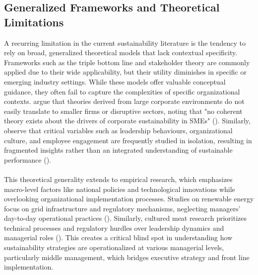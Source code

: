 	\subsection{Generalized Frameworks and Theoretical Limitations}
	A recurring limitation in the current sustainability literature is the tendency to rely on broad, generalized theoretical models that lack contextual specificity. Frameworks such as the triple bottom line and stakeholder theory are commonly applied due to their wide applicability, but their utility diminishes in specific or emerging industry settings. While these models offer valuable conceptual guidance, they often fail to capture the complexities of specific organizational contexts. \citeauthor{kutzschbach2021a} argue that theories derived from large corporate environments do not easily translate to smaller firms or disruptive sectors, noting that "no coherent theory exists about the drivers of corporate sustainability in SMEs" (\textcite{kutzschbach2021a}). Similarly, \citeauthor{keil2024a} observe that critical variables such as leadership behaviours, organizational culture, and employee engagement are frequently studied in isolation, resulting in fragmented insights rather than an integrated understanding of sustainable performance (\textcite{keil2024a}). 

	\paragraph*{} This theoretical generality extends to empirical research, which emphasizes macro-level factors like national policies and technological innovations while overlooking organizational implementation processes. Studies on renewable energy focus on grid infrastructure and regulatory mechanisms, neglecting managers' day-to-day operational practices (\textcite{IRENA2020}). Similarly, cultured meat research prioritizes technical processes and regulatory hurdles over leadership dynamics and managerial roles (\textcite{Bryant2020}). This creates a critical blind spot in understanding how sustainability strategies are operationalized at various managerial levels, particularly middle management, which bridges executive strategy and front line implementation.
	
